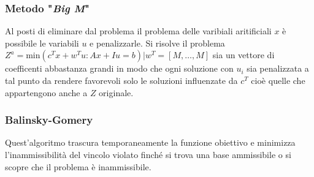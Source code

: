\documentclass{article}
\begin{document}
\subsubsection{Metodo "\textit{Big M}"}
Al posti di eliminare dal problema il problema delle varibiali aritificiali $x$ è possibile le variabili $u$ e penalizzarle. Si risolve il problema $Z^a=\text{min}(c^Tx+w^Tu:Ax+Iu=b)|w^T=[M,\dots,M]$ sia un vettore di coefficenti abbastanza grandi in modo che ogni soluzione con $u_i$ sia penalizzata a tal punto da rendere favorevoli solo le soluzioni influenzate da $c^T$ cioè quelle che appartengono anche a $Z$ originale.

\subsubsection{Balinsky-Gomery}
Quest'algoritmo trascura temporaneamente la funzione obiettivo e minimizza l'inammissibilità del vincolo violato finché si trova una base ammissibile o si scopre che il problema è inammissibile.
\end{document}
